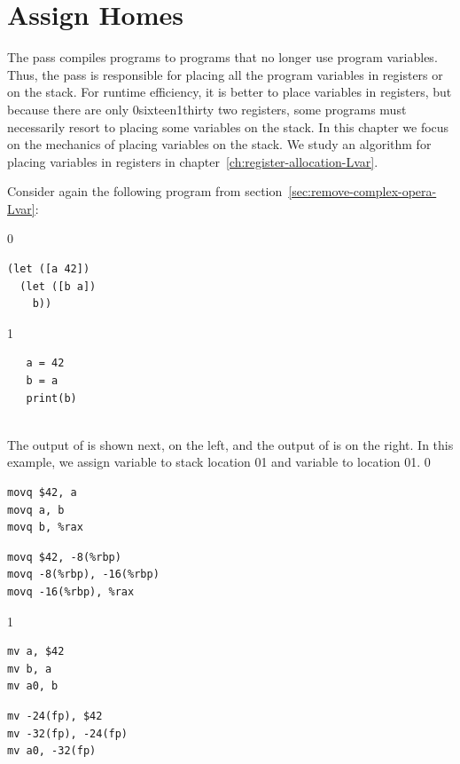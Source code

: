 \documentclass[7x10]{TimesAPriori_MIT}%
\def\racketEd{0}
\def\pythonEd{1}
\def\edition{1}
\def\xeightysixEd{0}
\def\riscvEd{1}
\def\architecture{1}
\newcommand\ifriscv[1]{\if\architecture\riscvEd{#1}\fi}
\newcommand\ifxeightsix[1]{\if\architecture\xeightysixEd{#1}\fi}
\newcommand{\pythonColor}[0]{}
\numberwithin{theorem}{chapter}
\numberwithin{definition}{chapter}
\numberwithin{equation}{chapter}
\begin{document}
\section{Assign Homes}
\label{sec:assign-Lvar}

The  pass compiles \LangXVar{} programs to
\LangXVar{} programs that no longer use program variables.  Thus, the
 pass is responsible for placing all the program
variables in registers or on the stack. For runtime efficiency, it is
better to place variables in registers, but because there are only
\ifxeightsix{sixteen}\ifriscv{thirty two} registers, some programs must necessarily resort to placing
some variables on the stack. In this chapter we focus on the mechanics
of placing variables on the stack. We study an algorithm for placing
variables in registers in chapter~\ref{ch:register-allocation-Lvar}.

Consider again the following \LangVar{} program from
section~\ref{sec:remove-complex-opera-Lvar}:\\
\begin{minipage}{0.96\textwidth}
{\if\edition\racketEd
\begin{lstlisting}
(let ([a 42])
  (let ([b a])
    b))
\end{lstlisting}
\fi}
{\if\edition\pythonEd\pythonColor
\begin{lstlisting}
   a = 42
   b = a
   print(b)
\end{lstlisting}
\fi}
\end{minipage}\\
%
The output of  is shown next, on the left,
and the output of  is on the right.  In this
example, we assign variable  to stack location
\ifxeightsix{}\ifriscv{} and variable
 to location
\ifxeightsix{}\ifriscv{}. 
\if\architecture\xeightysixEd
\begin{transformation}
\begin{lstlisting}[basicstyle=\ttfamily\footnotesize]
movq $42, a
movq a, b
movq b, %rax
\end{lstlisting}
\compilesto
\begin{lstlisting}[basicstyle=\ttfamily\footnotesize]
movq $42, -8(%rbp)
movq -8(%rbp), -16(%rbp)
movq -16(%rbp), %rax
\end{lstlisting}
\end{transformation}
\fi
\if\architecture\riscvEd
\begin{transformation}
\begin{lstlisting}[basicstyle=\ttfamily\footnotesize]
mv a, $42
mv b, a
mv a0, b
\end{lstlisting}
\compilesto
\begin{lstlisting}[basicstyle=\ttfamily\footnotesize]
mv -24(fp), $42
mv -32(fp), -24(fp)
mv a0, -32(fp)
\end{lstlisting}
\end{transformation}
\fi
\end{document}
